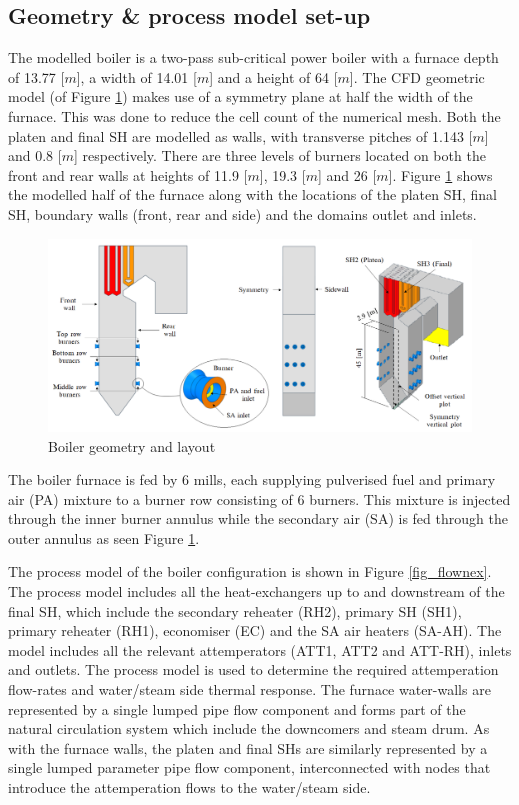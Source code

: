 \documentclass[review]{elsarticle}
\begin{document}
\subsection{Geometry \& process model set-up}
The modelled  boiler is a two-pass sub-critical power boiler with a furnace depth of 13.77 [$m$], a width of 14.01 [$m$] and a height of 64 [$m$]. The CFD geometric model (of Figure \ref{fig_geometry}) makes use of a symmetry plane at half the width of the furnace. This was done to reduce the cell count of the numerical mesh. Both the platen and final SH are modelled as walls, with transverse pitches of 1.143 [$m$] and 0.8 [$m$] respectively. There are three levels of burners located on both the front and rear walls at heights of 11.9 [$m$], 19.3 [$m$] and 26 [$m$]. Figure \ref{fig_geometry} shows the modelled half of the furnace along with the locations of the platen SH, final SH, boundary walls (front, rear and side) and the domains outlet and inlets.\\
\begin{figure} [h!]
\centerline{\includegraphics[scale=0.45]{GEOMETRY}}
\caption{Boiler geometry and layout}
\label{fig_geometry}
\end{figure}

The boiler furnace is fed by 6 mills, each supplying pulverised fuel and primary air (PA) mixture to a burner row consisting of 6 burners. This mixture is injected through the inner burner annulus while the secondary air (SA) is fed through the outer annulus as seen Figure \ref{fig_geometry}. 

The process model of the boiler configuration is shown in Figure \ref{fig_flownex}. The process model includes all the heat-exchangers up to and downstream of the final SH, which include the secondary reheater (RH2), primary SH (SH1), primary reheater (RH1), economiser (EC) and the SA air heaters (SA-AH). The model includes all the relevant attemperators (ATT1, ATT2 and ATT-RH), inlets and outlets. The process model is used to determine the required attemperation flow-rates and water/steam side thermal response. The furnace water-walls are represented by a single lumped pipe flow component and forms part of the natural circulation system which include the downcomers and steam drum. As with the furnace walls, the platen and final SHs are similarly represented by a single lumped parameter pipe flow component, interconnected with nodes that introduce the attemperation flows to the water/steam side. 
\end{document}
